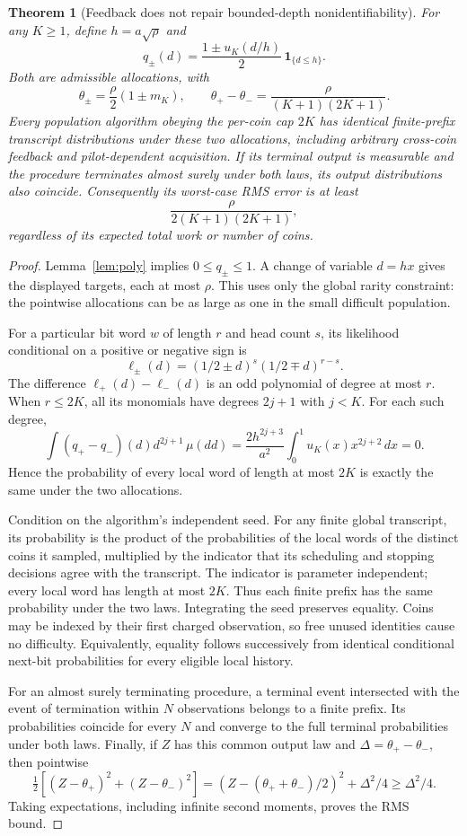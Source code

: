 \documentclass[11pt]{article}
\newtheorem{theorem}{Theorem}
\begin{document}
\begin{theorem}[Feedback does not repair bounded-depth nonidentifiability]
\label{thm:cap}
For any $K\ge1$, define $h=a\sqrt\rho$ and
\[
 q_\pm(d)=\frac{1\pm u_K(d/h)}2\,\mathbf1_{\{d\le h\}}.
\]
Both are admissible allocations, with
\[
 \theta_\pm=\frac\rho2(1\pm m_K),\qquad
 \theta_+-\theta_-=\frac\rho{(K+1)(2K+1)}.
\]
Every population algorithm obeying the per-coin cap $2K$ has identical
finite-prefix transcript distributions under these two allocations,
including arbitrary cross-coin feedback and pilot-dependent acquisition.
If its terminal output is measurable and the procedure terminates almost
surely under both laws, its output distributions also coincide. Consequently
its worst-case RMS error is at least
\[
 \frac\rho{2(K+1)(2K+1)},
\]
regardless of its expected total work or number of coins.
\end{theorem}
\begin{proof}
Lemma~\ref{lem:poly} implies $0\le q_\pm\le1$. A change of variable
$d=hx$ gives the displayed targets, each at most $\rho$. This uses only
the global rarity constraint: the pointwise allocations can be as large as
one in the small difficult population.

For a particular bit word $w$ of length $r$ and head count $s$, its likelihood
conditional on a positive or negative sign is
\[
 \ell_\pm(d)=(1/2\pm d)^s(1/2\mp d)^{r-s}.
\]
The difference $\ell_+(d)-\ell_-(d)$ is an odd polynomial of degree at most
$r$. When $r\le2K$, all its monomials have degrees $2j+1$ with $j<K$.
For each such degree,
\[
 \int(q_+-q_-)(d)d^{2j+1}\,\mu(dd)
 =\frac{2h^{2j+3}}{a^2}\int_0^1u_K(x)x^{2j+2}\,dx=0.
\]
Hence the probability of every local word of length at most $2K$ is exactly
the same under the two allocations.

Condition on the algorithm's independent seed. For any finite global
transcript, its probability is the product of the probabilities of the
local words of the distinct coins it sampled, multiplied by the indicator
that its scheduling and stopping decisions agree with the transcript.
The indicator is parameter independent; every local word has length at most
$2K$. Thus each finite prefix has the same probability under the two laws.
Integrating the seed preserves equality. Coins may be indexed by their
first charged observation, so free unused identities cause no difficulty.
Equivalently, equality follows successively from identical conditional
next-bit probabilities for every eligible local history.

For an almost surely terminating procedure, a terminal event intersected
with the event of termination within $N$ observations belongs to a finite
prefix. Its probabilities coincide for every $N$ and converge to the full
terminal probabilities under both laws. Finally, if $Z$ has this common
output law and $\Delta=\theta_+-\theta_-$, then pointwise
\[
 \tfrac12[(Z-\theta_+)^2+(Z-\theta_-)^2]
 =(Z-(\theta_++\theta_-)/2)^2+\Delta^2/4\ge\Delta^2/4.
\]
Taking expectations, including infinite second moments, proves the RMS bound.
\end{proof}
\end{document}
